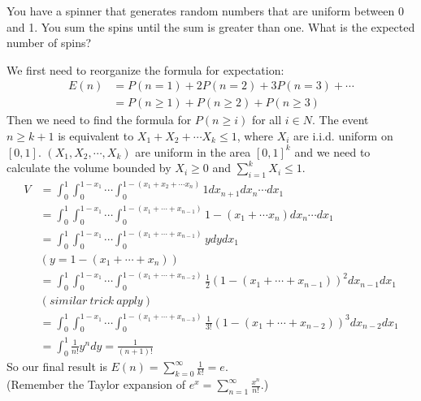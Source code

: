 \begin{exe}[Spinner]
You have a spinner that generates random numbers that are uniform between 0 and 1. You sum the spins until the sum is greater than one. What is the expected number of spins?
\end{exe}
\begin{teacher}
\begin{sol}
We first need to reorganize the formula for expectation:\\
\begin{align*}
E(n) &= P(n=1) +2P(n=2) +3P(n=3)+\cdots \\
&=P(n\geq1) + P(n\geq 2) +P(n\geq3)
\end{align*}
Then we need to find the formula for $P(n\geq i)$ for all $i \in N$. The event $n\geq k+1$ is equivalent to $X_1+X_2+\cdots X_{k}\leq 1$, where $X_i$ are i.i.d. uniform on $[0,1]$. $(X_1, X_2, \cdots, X_k)$ are uniform in the area $[0,1]^k$ and we need to calculate the volume bounded by $X_i\geq 0$ and $\sum\limits_{i=1}^k X_i \leq 1$.
\begin{align*}
    V &=\int_0^1\int_0^{1-x_1}\cdots \int_0^{1-(x_1+x_2+\cdots x_n)} 1dx_{n+1}dx_n \cdots dx_1\\
    &=\int_0^1\int_0^{1-x_1}\cdots \int_0^{1-(x_1+\cdots +x_{n-1})}1-(x_1+\cdots x_n)dx_n\cdots dx_1\\
    &= \int_0^1\int_0^{1-x_1}\cdots \int_0^{1-(x_1+\cdots+x_{n-1})}ydydx_1\\
    & (y=1-(x_1+ \cdots +x_n)) \\
    &=\int_0^1\int_0^{1-x_1}\cdots \int_0^{1-(x_1+\cdots+x_{n-2})}\frac{1}{2}(1-(x_1+\cdots+x_{n-1}))^2dx_{n-1} dx_1\\
    &(similar\ trick\ apply)\\
    &=\int_0^1\int_0^{1-x_1}\cdots \int_0^{1-(x_1+\cdots+x_{n-3})}\frac{1}{3!}(1-(x_1+\cdots+x_{n-2}))^3dx_{n-2} dx_1\\
    &=\int_0^1 \frac{1}{n!}y^ndy = \frac{1}{(n+1)!}
\end{align*}
So our final result is $E(n)=\sum\limits_{k=0}^{\infty} \frac{1}{k!}=e$. \\
(Remember the Taylor expansion of $e^x = \sum\limits_{n=1}^{\infty} \frac{x^n}{n!}$.)
\end{sol}
\end{teacher}

